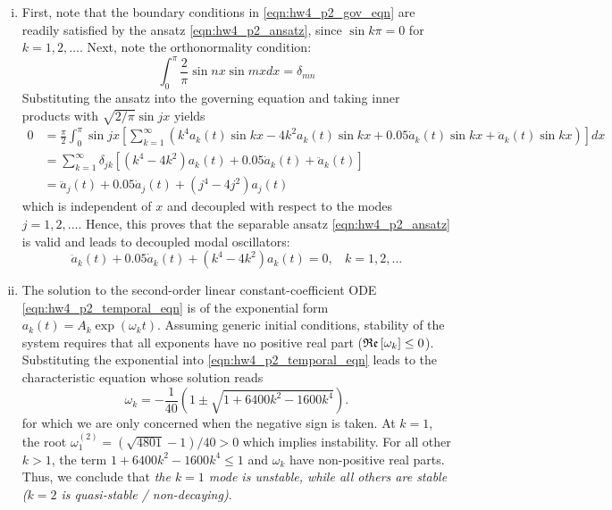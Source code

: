 \begin{enumerate}[(i)]
\item { %
    First, note that the boundary conditions in \cref{eqn:hw4_p2_gov_eqn} are readily satisfied by the ansatz \cref{eqn:hw4_p2_ansatz}, since $\sin k\pi = 0$ for $k = 1, 2, \ldots$. 
    Next, note the orthonormality condition:
    \begin{equation}
        \int_0^\pi \frac{2}{\pi}\sin nx \sin mx dx = \delta_{mn}
    \end{equation}
    Substituting the ansatz into the governing equation and taking inner products with $\sqrt{2/\pi}\sin jx$ yields
    \begin{equation}
    \begin{aligned}
        0 &= \frac{\pi}{2} \int_0^\pi \sin jx \left[\sum_{k=1}^\infty \left(k^4 a_k(t) \sin kx - 4k^2 a_k(t) \sin kx + 0.05 \dot{a}_k(t) \sin kx + \ddot{a}_k(t) \sin kx  \right) \right] dx \\
        &= \sum_{k=1}^\infty \delta_{jk} \left[\left(k^4 - 4k^2\right)a_k(t) + 0.05 \dot{a}_k(t) + \ddot{a}_k(t) \right] \\
        &= \ddot{a}_j(t) + 0.05 \dot{a}_j(t) + \left(j^4 - 4j^2\right)a_j(t)
    \end{aligned}
    \end{equation}
    which is independent of $x$ and decoupled with respect to the modes $j = 1, 2, \ldots$. 
    Hence, this proves that the separable ansatz \cref{eqn:hw4_p2_ansatz} is valid and leads to decoupled modal oscillators:
    \begin{equation}\label{eqn:hw4_p2_temporal_eqn}
        \boxed{\ddot{a}_k(t) + 0.05 \dot{a}_k(t) + \left(k^4 - 4k^2\right)a_k(t) = 0}, ~~~~ k = 1, 2, \ldots
    \end{equation}
}
\item { %
    The solution to the second-order linear constant-coefficient ODE \cref{eqn:hw4_p2_temporal_eqn} is of the exponential form $a_k(t) = A_k \exp (\omega_k t)$. 
    Assuming generic initial conditions, stability of the system requires that all exponents have no positive real part ($\mathfrak{Re}\left[\omega_k\right] \leq 0$).
    Substituting the exponential into \cref{eqn:hw4_p2_temporal_eqn} leads to the characteristic equation whose solution reads 
    \begin{equation}
        \omega_k = -\frac{1}{40} \left(1 \pm \sqrt{1 + 6400 k^2 - 1600 k^4} \right).
    \end{equation}
    for which we are only concerned when the negative sign is taken. 
    At $k = 1$, the root $\omega_1^{(2)} = (\sqrt{4801} - 1) / 40 > 0$ which implies instability. 
    For all other $k > 1$, the term $1 + 6400k^2 - 1600k^4 \leq 1$ and $\omega_k$ have non-positive real parts. 
    Thus, we conclude that \emph{the $k = 1$ mode is unstable, while all others are stable ($k = 2$ is quasi-stable / non-decaying)}. 

}
\end{enumerate}
